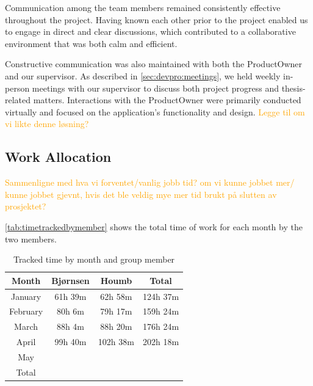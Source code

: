 Communication among the team members remained consistently effective throughout the project. Having known each other prior to the project enabled us to engage in direct and clear discussions, which contributed to a collaborative environment that was both calm and efficient.

Constructive communication was also maintained with both the \gls{ProductOwner} and our supervisor. As described in \autoref{sec:devpro:meetings}, we held weekly in-person meetings with our supervisor to discuss both project progress and thesis-related matters. Interactions with the \gls{ProductOwner} were primarily conducted virtually and focused on the application's functionality and design. \textcolor{orange}{Legge til om vi likte denne løsning?}

\subsection{Work Allocation}

\textcolor{orange}{Sammenligne med hva vi forventet/vanlig jobb tid? om vi kunne jobbet mer/ kunne jobbet gjevnt, hvis det ble veldig mye mer tid brukt på slutten av prosjektet?}

\autoref{tab:timetrackedbymember} shows the total time of work for each month by the two members.

\begin{table}[h]
    \centering
    \begin{tabular}{c|c|c|c}
        \hline
        \textbf{Month} & \textbf{Bjørnsen} & \textbf{Houmb} & \textbf{Total} \\
        \hline
        January  & 61h 39m  & 62h 58m   & 124h 37m  \\
        February & 80h 6m   & 79h 17m   & 159h 24m  \\
        March    & 88h 4m   & 88h 20m   & 176h 24m  \\
        April    & 99h 40m  & 102h 38m  & 202h 18m  \\
        May      &        &        &        \\
        \hline
        Total & & & \\
        \hline
    \end{tabular}
    \caption{Tracked time by month and group member}
    \label{tab:timetrackedbymember}
\end{table}


